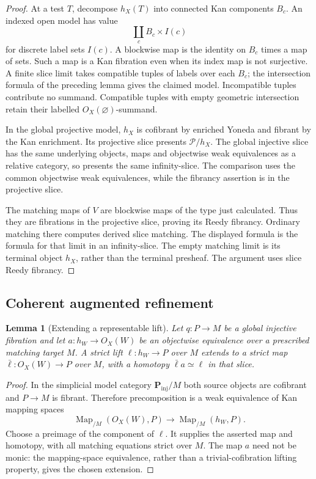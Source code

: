 \documentclass[12pt]{amsart}
\newtheorem{lem}[thm]{Lemma}
\theoremstyle{definition}
\theoremstyle{remark}
\numberwithin{equation}{section}
\DeclareMathOperator{\Map}{Map}
\begin{document}
\begin{proof}
At a test $T$, decompose $h_X(T)$ into connected
Kan components $B_c$. An indexed open model has value
\[
 \coprod_c B_c\times I(c)
\]
for discrete label sets $I(c)$. A blockwise map is
the identity on $B_c$ times a map of sets.
Such a map is a Kan fibration even when its index
map is not surjective. A finite slice limit takes
compatible tuples of labels over each $B_c$; the
intersection formula of the preceding lemma gives
the claimed model. Incompatible tuples contribute
no summand. Compatible tuples with empty geometric
intersection retain their labelled
$O_X(\varnothing)$-summand.

In the global projective model, $h_X$ is cofibrant
by enriched Yoneda and fibrant by the Kan enrichment.
Its projective slice presents $\mathcal P/h_X$.
The global injective slice has the same underlying
objects, maps and objectwise weak equivalences as a
relative category, so presents the same infinity-slice.
The comparison uses the common objectwise weak
equivalences, while the fibrancy assertion is in
the projective slice.

The matching maps of $V$ are blockwise maps of the
type just calculated. Thus they are fibrations in
the projective slice, proving its Reedy fibrancy.
Ordinary matching there computes derived slice
matching. The displayed formula is the formula
for that limit in an infinity-slice. The empty
matching limit is its terminal object $h_X$, rather
than the terminal presheaf. The argument uses
slice Reedy fibrancy.
\end{proof}

\subsection{Coherent augmented refinement}

\begin{lem}[Extending a representable lift]
Let $q:P\to M$ be a global injective fibration and
let $a:h_W\to O_X(W)$ be an objectwise equivalence
over a prescribed matching target $M$.
\label{lem:banach-open-lift-extension}
A strict lift $\ell:h_W\to P$ over $M$ extends to
a strict map $\bar\ell:O_X(W)\to P$ over $M$,
with a homotopy $\bar\ell a\simeq\ell$ in that slice.
\end{lem}

\begin{proof}
In the simplicial model category $\mathbf P_{\mathrm{inj}}/M$
both source objects are cofibrant and $P\to M$ is
fibrant. Therefore precomposition is a weak equivalence
of Kan mapping spaces
\[
 \Map_{/M}(O_X(W),P)\longrightarrow\Map_{/M}(h_W,P).
\]
Choose a preimage of the component of $\ell$.
It supplies the asserted map and homotopy, with all
matching equations strict over $M$.
The map $a$ need not be monic: the mapping-space
equivalence, rather than a trivial-cofibration
lifting property, gives the chosen extension.
\end{proof}
\end{document}
